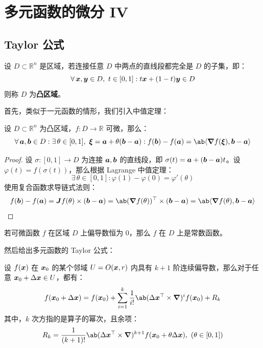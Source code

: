 \section{多元函数的微分 IV}

\subsection{Taylor 公式}

\begin{definition}[凸区域]
    设 $D \subset \mathbb{R}^{n}$ 是区域，若连接任意 $D$ 中两点的直线段都完全是 $D$ 的子集，即：
    $$
    \forall\,\boldsymbol{x}, \boldsymbol{y} \in D,\ t \in [0, 1]: t \boldsymbol{x} + (1 - t)\boldsymbol{y} \in D
    $$
    则称 $D$ 为\textbf{凸区域}。
\end{definition}

首先，类似于一元函数的情形，我们引入中值定理：

\begin{theorem}[中值定理]
    设 $D \subset \mathbb{R}^{n}$ 为凸区域，$f: D \to \mathbb{R}$ 可微，那么：
    $$
    \forall\,\vect{a}, \vect{b} \in D: \exists\,\theta \in [0, 1],\ \vect{\xi} = \vect{a} + \theta (\vect{b} - \vect{a}): f(\vect{b}) - f(\vect{a}) = \ab\langle\grad f(\vect{\xi}) , \vect{b} - \vect{a}\rangle
    $$
    \begin{proof}
        设 $\sigma: [0, 1] \to D$ 为连接 $\boldsymbol{a}, \boldsymbol{b}$ 的直线段，即 $\sigma(t) = \boldsymbol{a} + (\boldsymbol{b} - \boldsymbol{a}) t$。设 $\varphi(t) = f(\sigma(t))$，那么根据 Lagrange 中值定理：
        $$
        \exists\,\theta \in [0, 1]: \varphi(1) - \varphi(0) = \varphi'(\theta)
        $$
        使用复合函数求导链式法则：
        $$
        f(\vect{b}) - f(\vect{a}) = \vect{J} f(\theta) \times (\vect{b} - \vect{a}) = \ab(\grad f(\theta))^\top \times (\vect{b} - \vect{a}) = \ab\langle\grad f(\theta), \vect{b} - \vect{a}\rangle
        $$
    \end{proof}
\end{theorem}

\begin{corollary}
    若可微函数 $f$ 在区域 $D$ 上偏导数恒为 $0$，那么 $f$ 在 $D$ 上是常数函数。
\end{corollary}

然后给出多元函数的 Taylor 公式：

\begin{theorem}[Taylor 公式]
    设 $f(\boldsymbol{x})$ 在 $\boldsymbol{x}_0$ 的某个邻域 $U = O(\boldsymbol{x}, r)$ 内具有 $k + 1$ 阶连续偏导数，那么对于任意 $\boldsymbol{x}_0 + \Delta \boldsymbol{x} \in U$，都有：
    $$
    f(\vect{x}_0 + \Delta \vect{x}) = f(\vect{x}_0) + \sum_{i = 1}^{k} \frac{1}{i!} \ab(\Delta \vect{x}^\top \times \grad)^{i} f(\vect{x}_0) + R_k
    $$
    其中，$k$ 次方指的是算子的幂次，且余项：
    $$
    R_k = \frac{1}{(k + 1)!} \ab(\Delta \vect{x}^\top \times \grad)^{k + 1} f(\vect{x}_0 + \theta \Delta \vect{x}),\ (\theta \in [0, 1])
    $$
\end{theorem}

